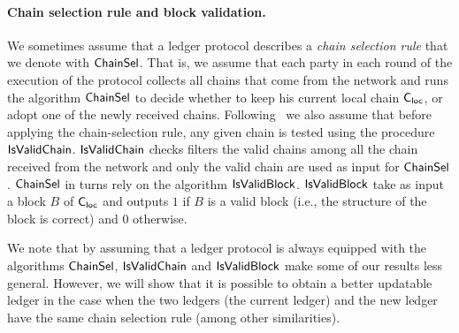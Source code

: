 \paragraph{Chain selection rule and block validation.} We sometimes assume that a ledger protocol describes a \emph{chain selection rule} that we denote with $\mathsf{ChainSel}$.
That is, we assume that  each party in each round of the execution of the protocol collects all chains that come from the network and runs the algorithm $\mathsf{ChainSel}$ to decide whether to keep his current local chain $\mathsf{C_{loc}}$, or adopt one of the newly received chains. 
Following~\cite{C:BMTZ17} we also assume 
that before applying the chain-selection rule, any given chain is tested
 using the procedure $\mathsf{IsValidChain}$. $\mathsf{IsValidChain}$ checks filters the
 valid chains among all the chain received from the network and only
 the valid chain are used as input for $\mathsf{ChainSel}$.
 $\mathsf{ChainSel}$ in turns rely on the algorithm $\mathsf{IsValidBlock}$.
 $\mathsf{IsValidBlock}$ take as input a block $B$ of $\mathsf{C_{loc}}$ and outputs $1$ if $B$ is a valid block (i.e., the structure of
 the block is correct) and  $0$ otherwise.
 
 
 We note that by assuming that a ledger protocol is always equipped with the algorithms $\mathsf{ChainSel}$, 
 $\mathsf{IsValidChain}$ and $\mathsf{IsValidBlock}$ make some of our results less general. However, we will show that it is possible to
obtain a better updatable ledger in the case when the two ledgers (the current ledger) and the new ledger have the same chain selection rule (among other similarities).


